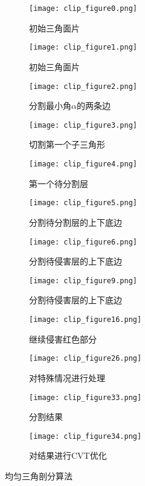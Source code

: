 \begin{figure}[htbp]
	\centering
	\begin{subfigure}[b]{.32\textwidth}
		\centering
		\texttt{[image: clip\_figure0.png]}
		\caption{初始三角面片}\label{subfig:clip0}
	\end{subfigure}
	\begin{subfigure}[b]{.32\textwidth}
		\centering
		\texttt{[image: clip\_figure1.png]}
		\caption{初始三角面片}\label{subfig:clip1}
	\end{subfigure}
	\begin{subfigure}[b]{.32\textwidth}
		\centering
		\texttt{[image: clip\_figure2.png]}
		\caption{分割最小角$\alpha$的两条边}\label{subfig:clip2}
	\end{subfigure}

	\begin{subfigure}[b]{.32\textwidth}
		\centering
		\texttt{[image: clip\_figure3.png]}
		\caption{切割第一个子三角形}\label{subfig:clip3}
	\end{subfigure}
	\begin{subfigure}[b]{.32\textwidth}
		\centering
		\texttt{[image: clip\_figure4.png]}
		\caption{第一个待分割层}\label{subfig:clip4}
	\end{subfigure}
	\begin{subfigure}[b]{.32\textwidth}
		\centering
		\texttt{[image: clip\_figure5.png]}
		\caption{分割待分割层的上下底边}\label{subfig:clip5}
	\end{subfigure}

	\begin{subfigure}[b]{.32\textwidth}
		\centering
		\texttt{[image: clip\_figure6.png]}
		\caption{分割待侵害层的上下底边}\label{subfig:clip6}
	\end{subfigure}
	\begin{subfigure}[b]{.32\textwidth}
		\centering
		\texttt{[image: clip\_figure9.png]}
		\caption{分割待侵害层的上下底边}\label{subfig:clip9}
	\end{subfigure}
	\begin{subfigure}[b]{.32\textwidth}
		\centering
		\texttt{[image: clip\_figure16.png]}
		\caption{继续侵害红色部分}\label{subfig:clip16}
	\end{subfigure}

	\begin{subfigure}[b]{.32\textwidth}
		\centering
		\texttt{[image: clip\_figure26.png]}
		\caption{对特殊情况进行处理}\label{subfig:clip26}
	\end{subfigure}
	\begin{subfigure}[b]{.32\textwidth}
		\centering
		\texttt{[image: clip\_figure33.png]}
		\caption{分割结果}\label{subfig:clip33}
	\end{subfigure}
	\begin{subfigure}[b]{.32\textwidth}
		\centering
		\texttt{[image: clip\_figure34.png]}
		\caption{对结果进行CVT优化}\label{subfig:clip34}
	\end{subfigure}
	\caption{均匀三角剖分算法}\label{fig:clip}
\end{figure}

